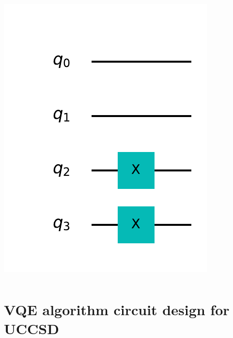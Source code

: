 \documentclass{beamer}
\renewcommand{\(}{\left(}
\renewcommand{\)}{\right)}
\renewcommand{\[}{\left[}
\renewcommand{\]}{\right]}
\begin{document}
\begin{frame}
\begin{columns}
\begin{column}[]{0.35\textwidth}
\begin{center}
                \includegraphics[scale=0.5]{initial_state_r.pdf}
            \end{center} 
        \end{column}
    \end{columns}

\end{frame}

\section{VQE algorithm circuit design for UCCSD}
\end{document}
